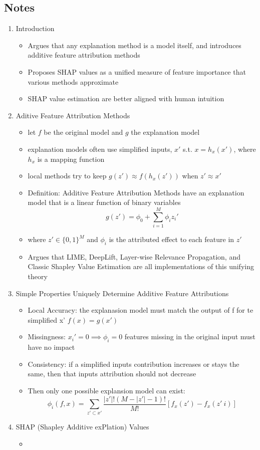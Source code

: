 \documentclass{article}
\begin{document}
\subsection*{Notes}

\begin{enumerate}
	\item Introduction
	\begin{itemize}
		\item Argues that any explanation method is a model itself, and introduces additive feature attribution methods
		\item Proposes SHAP values as a unified measure of feature importance that various methods approximate
		\item SHAP value estimation are better aligned with human intuition
	\end{itemize}
	\item Aditive Feature Attribution Methods
	\begin{itemize}
		\item let $f$ be the original model and $g$ the explanation model
		\item explanation models often use simplified inputs, $x'$ s.t. $x = h_x(x')$, where $h_x$ is a mapping function
		\item local methods try to keep $g(z') \approx f(h_x(z'))$ when $z' \approx x'$
		\item Definition: Additive Feature Attribution Methods have an explanation model that is a linear function of binary variables 
		$$g(z') = \phi_0 + \sum_{i=1}^{M} \phi_i z_i'$$
		\item where $z' \in \{ 0, 1 \}^M$ and $\phi_i$ is the attributed effect to each feature in $z'$
		\item Argues that LIME, DeepLift, Layer-wise Relevance Propagation, and Classic Shapley Value Estimation are all implementations of this unifying theory
	\end{itemize}
	\item Simple Properties Uniquely Determine Additive Feature Attributions
	\begin{itemize}
		\item Local Accuracy: the explanasion model must match the output of f for te simplified x' $f(x) = g(x')$
		\item Missingness: $x_i' = 0 \implies \phi_i = 0$ features missing in the original input must have no impact
		\item Consistency: if a simplified inputs contribution increases or stays the same, then that inputs attribution should not decrease
		\item Then only one possible explansion model can exist:
		$$\phi_i(f, x) = \sum_{z' \subset x'} \frac{|z'|! (M-|z'|-1)!}{M!} [f_x(z') - f_x(z' \ i)]$$
	\end{itemize}
	\item SHAP (Shapley Additive exPlation) Values
	\begin{itemize}
		\item 
	\end{itemize}
\end{enumerate}
\end{document}
